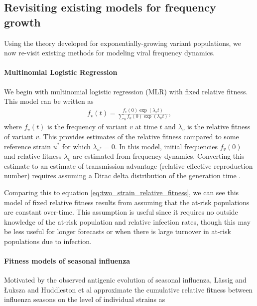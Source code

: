 \documentclass[11pt,oneside,letterpaper]{article}
\begin{document}
\subsection{Revisiting existing models for frequency growth}\label{ssec:existing_frequency_models}

Using the theory developed for exponentially-growing variant populations, we now re-visit existing methods for modeling viral frequency dynamics.

\paragraph{Multinomial Logistic Regression}%

We begin with multinomial logistic regression (MLR) with fixed relative fitness.
This model can be written as
\begin{align}
    f_{v}(t) = \frac{f_{v}(0) \exp(\lambda_{v} t)}{\sum_{u} f_{u}(0) \exp(\lambda_{u} t)},
\end{align}
where $f_{v}(t)$ is the frequency of variant $v$ at time $t$ and $\lambda_{v}$ is the relative fitness of variant $v$.
This provides estimates of the relative fitness compared to some reference strain $u^{*}$ for which $\lambda_{u^*} = 0$.
In this model, initial frequencies $f_{v}(0)$ and relative fitness $\lambda_{v}$ are estimated from frequency dynamics.
Converting this estimate to an estimate of transmission advantage (relative effective reproduction number) requires assuming a Dirac delta distribution of the generation time \cite{Wallinga2006}.

Comparing this to equation \ref{eq:two_strain_relative_fitness}, we can see this model of fixed relative fitness results from assuming that the at-risk populations are constant over-time.
This assumption is useful since it requires no outside knowledge of the at-risk population and relative infection rates, though this may be less useful for longer forecasts or when there is large turnover in at-risk populations due to infection.

\paragraph{Fitness models of seasonal influenza}%

Motivated by the observed antigenic evolution of seasonal influenza, L{\"a}ssig and {\L}uksza \cite{luksza2014predictive} and Huddleston et al \cite{Huddleston2020} approximate the cumulative relative fitness between influenza seasons on the level of individual strains as
\end{document}
